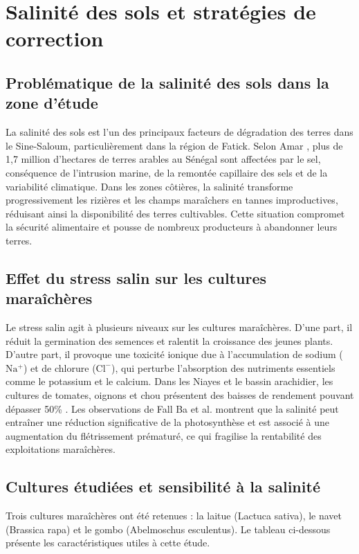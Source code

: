 \section{Salinité des sols et stratégies de correction}
\subsection{Problématique de la salinité des sols dans la zone d'étude}
La salinité des sols est l’un des principaux facteurs de dégradation des terres dans le Sine-Saloum, particulièrement dans la région de Fatick. Selon Amar \cite{noauthor_salinisation_nodate}, plus de 1,7 million d'hectares de terres arables au Sénégal sont affectées par le sel, conséquence de l’intrusion marine, de la remontée capillaire des sels et de  la variabilité climatique. Dans les zones côtières, 
la salinité transforme progressivement les rizières et les champs maraîchers en tannes improductives, réduisant ainsi la disponibilité des terres cultivables. Cette situation compromet la sécurité alimentaire et pousse de nombreux producteurs à abandonner leurs terres.


\subsection{Effet du stress salin sur les cultures maraîchères}
Le stress salin agit à plusieurs niveaux sur les cultures maraîchères. D’une part, il réduit la germination des semences et ralentit la croissance des jeunes plants. D’autre part, il provoque une toxicité ionique due à l'accumulation de sodium ($\mathrm{Na^{+}}$) et de chlorure ($\mathrm{Cl^{-}}$), qui perturbe l’absorption des nutriments essentiels comme le potassium et le calcium. Dans les Niayes et le bassin arachidier, les cultures de tomates, oignons et chou présentent des baisses de rendement pouvant dépasser 50\% \cite{fall_salt_nodate}. Les observations de Fall Ba et al. \cite{fall_salt_nodate} montrent que la salinité  peut entraîner une réduction significative de la photosynthèse et est associé à une augmentation du flétrissement prématuré, ce qui fragilise la rentabilité des exploitations maraîchères.

\subsection{Cultures étudiées et sensibilité à la salinité}
Trois cultures maraîchères ont été retenues : la laitue (Lactuca sativa), le navet (Brassica rapa) et le gombo (Abelmoschus esculentus). Le tableau ci-dessous présente les caractéristiques utiles à cette étude.

